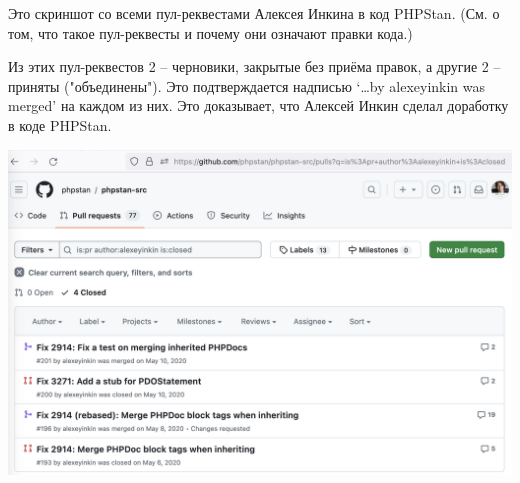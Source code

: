 
Это скриншот со всеми пул-реквестами Алексея Инкина в код PHPStan.
(См.  о том, что такое пул-реквесты и почему они означают правки кода.)

Из этих пул-реквестов 2 -- черновики, закрытые без приёма правок,
а другие 2 -- приняты ("объединены").
Это подтверждается надписью `\dots by alexeyinkin was merged' на каждом из них.
Это доказывает, что Алексей Инкин сделал доработку в коде PHPStan.

\begin{center}
    \includegraphics[width=\textwidth]{prs}
\end{center}

\pagebreak
